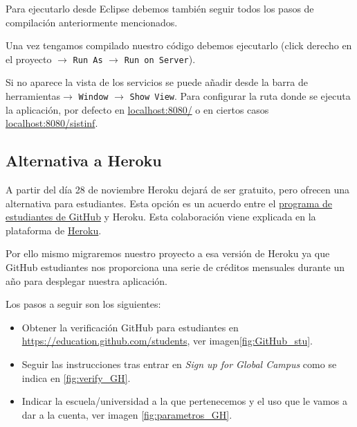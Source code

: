 
Para ejecutarlo desde Eclipse debemos también seguir todos los pasos de compilación anteriormente mencionados.

Una vez tengamos compilado nuestro código debemos ejecutarlo (click derecho en el proyecto $\rightarrow$ \texttt{Run As} $\rightarrow$ \texttt{Run on Server}).

Si no aparece la vista de los servicios se puede añadir desde la barra de herramientas$\rightarrow$ \texttt{Window} $\rightarrow$ \texttt{Show View}. Para configurar la ruta donde se ejecuta la aplicación, por defecto en \href{http://localhost:8080/}{localhost:8080/} o en ciertos casos \href{http://localhost:8080/sistinf}{localhost:8080/sistinf}.

\subsection{Alternativa a Heroku}

A partir del día 28 de noviembre Heroku dejará de ser gratuito, pero ofrecen una alternativa para estudiantes. Esta opción es un acuerdo entre el \href{https://education.github.com}{programa de estudiantes de GitHub} y Heroku. 
Esta colaboración viene explicada en la plataforma de \href{https://blog.heroku.com/github-student-developer-program}{Heroku}.

Por ello mismo migraremos nuestro proyecto a esa versión de Heroku ya que GitHub estudiantes nos proporciona una serie de créditos mensuales durante un año para desplegar nuestra aplicación.

Los pasos a seguir son los siguientes:
\begin{itemize}
	\item Obtener la verificación GitHub para estudiantes en
	 \href{https://education.github.com/students}{https://education.github.com/students}, ver imagen\ref{fig:GitHub_stu}.
	\item Seguir las instrucciones tras entrar en \emph{Sign up for Global Campus} como se indica en \ref{fig:verify_GH}.
	\item Indicar la escuela/universidad a la que pertenecemos y el uso que le vamos a dar a la cuenta, ver imagen \ref{fig:parametros_GH}.
\end{itemize}

